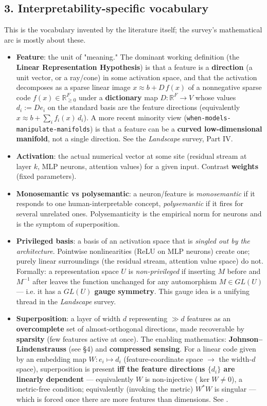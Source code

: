\subsection*{3. Interpretability-specific vocabulary}

This is the vocabulary invented by the literature itself; the survey's mathematical arc is mostly about these.


\begin{itemize}
\item \textbf{Feature}: the unit of "meaning." The dominant working definition (the \textbf{Linear Representation Hypothesis}) is that a feature is a \textbf{direction} (a unit vector, or a ray/cone) in some activation space, and that the activation decomposes as a sparse linear image $x \approx b + D\,f(x)$ of a nonnegative sparse code $f(x)\in\mathbb{R}^F_{\ge 0}$ under a \textbf{dictionary} map $D : \mathbb{R}^F \to V$ whose values $d_i := D e_i$ on the standard basis are the feature directions (equivalently $x \approx b + \sum_i f_i(x)\, d_i$). A more recent minority view (\texttt{when-models-manipulate-manifolds}) is that a feature can be a \textbf{curved low-dimensional manifold}, not a single direction. See the \emph{Landscape} survey, Part IV.
\item \textbf{Activation}: the actual numerical vector at some site (residual stream at layer $k$, MLP neurons, attention values) for a given input. Contrast \textbf{weights} (fixed parameters).
\item \textbf{Monosemantic vs polysemantic}: a neuron/feature is \emph{monosemantic} if it responds to one human-interpretable concept, \emph{polysemantic} if it fires for several unrelated ones. Polysemanticity is the empirical norm for neurons and is the symptom of superposition.
\item \textbf{Privileged basis}: a basis of an activation space that is \emph{singled out by the architecture}. Pointwise nonlinearities (ReLU on MLP neurons) create one; purely linear surroundings (the residual stream, attention value space) do not. Formally: a representation space $U$ is \emph{non-privileged} if inserting $M$ before and $M^{-1}$ after leaves the function unchanged for any automorphism $M\in GL(U)$ --- i.e. it has a \textbf{$GL(U)$ gauge symmetry}. This gauge idea is a unifying thread in the \emph{Landscape} survey.
\item \textbf{Superposition}: a layer of width $d$ representing $\gg d$ features as an \textbf{overcomplete} set of almost-orthogonal directions, made recoverable by \textbf{sparsity} (few features active at once). The enabling mathematics: \textbf{Johnson--Lindenstrauss} (see §4) and \textbf{compressed sensing}. For a linear code given by an embedding map $W : e_i \mapsto d_i$ (feature-coordinate space $\to$ the width-$d$ space), superposition is present \textbf{iff the feature directions $\{d_i\}$ are linearly dependent} --- equivalently $W$ is non-injective ($\ker W\neq 0$), a metric-free condition; equivalently (invoking the metric) $W^{*}W$ is singular --- which is forced once there are more features than dimensions. See \textcite{toy-models-superposition}.

\end{itemize}
